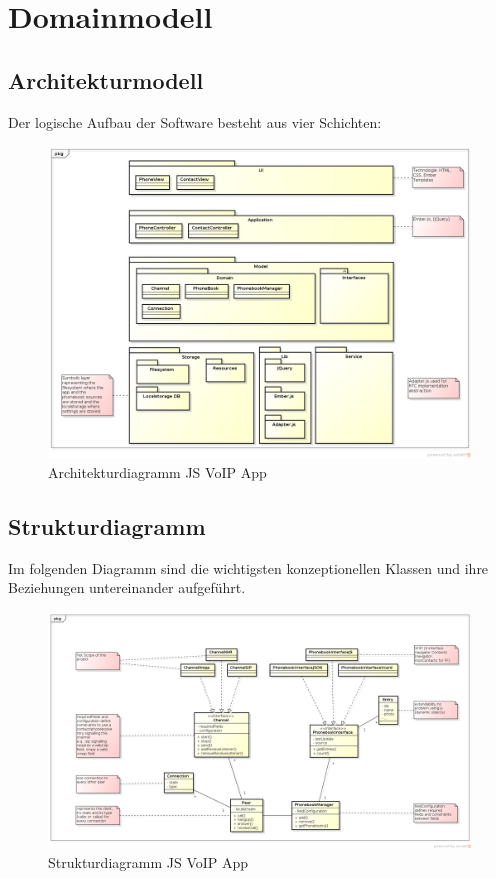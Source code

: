 \chapter{Domainmodell}

\section{Architekturmodell}
	Der logische Aufbau der Software besteht aus vier Schichten:
	\begin{figure}[h]
		\centering
		\includegraphics[width=1\textwidth]{img/architecture.png}
		\caption{Architekturdiagramm JS VoIP App}
	\end{figure}

	\begin{landscape}
		\section{Strukturdiagramm}
			Im folgenden Diagramm sind die wichtigsten konzeptionellen Klassen und ihre Beziehungen untereinander aufgeführt.
			\begin{figure}[h]
				\centering
				\includegraphics[width=1.2\textwidth]{img/domain.png}
				\caption{Strukturdiagramm JS VoIP App}
			\end{figure}
	\end{landscape}
	\clearpage

